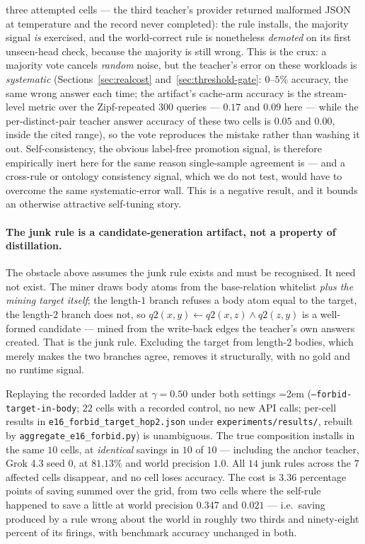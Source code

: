 \documentclass[11pt]{article}
\theoremstyle{plain}
\begin{document}
three attempted cells --- the third teacher's provider returned malformed JSON
at temperature and the record never completed): the
rule installs, the majority signal \emph{is} exercised, and the world-correct rule
is nonetheless \emph{demoted} on its first unseen-head check, because the majority
is still wrong. This is the crux: a majority vote cancels \emph{random} noise, but
the teacher's error on these workloads is \emph{systematic} (Sections~\ref{sec:realcost}
and~\ref{sec:threshold-gate}: $0$--$5\%$ accuracy, the same wrong answer each time;
the artifact's cache-arm accuracy is the stream-level metric over the
Zipf-repeated $300$ queries --- $0.17$ and $0.09$ here --- while the
per-distinct-pair teacher answer accuracy of these two cells is $0.05$ and
$0.00$, inside the cited range),
so the vote reproduces the mistake rather than washing it out. Self-consistency,
the obvious label-free promotion signal, is therefore empirically inert here for
the same reason single-sample agreement is --- and a cross-rule or ontology
consistency signal, which we do not test, would have to overcome the same
systematic-error wall. This is a negative result, and it bounds an otherwise
attractive self-tuning story.

\paragraph{The junk rule is a candidate-generation artifact, not a property of
distillation.} The obstacle above assumes the junk rule exists and must be
recognised. It need not exist. The miner draws body atoms from the base-relation
whitelist \emph{plus the mining target itself}; the length-$1$ branch refuses a
body atom equal to the target, the length-$2$ branch does not, so
$q2(x,y)\!\leftarrow\!q2(x,z)\wedge q2(z,y)$ is a well-formed candidate --- mined
from the write-back edges the teacher's own answers created. That is the junk
rule. Excluding the target from length-$2$ bodies, which merely makes the two
branches agree, removes it structurally, with no gold and no runtime signal.

Replaying the recorded ladder at $\gamma{=}0.50$ under both settings
{\emergencystretch=2em (\texttt{--forbid-target-in-body};
$22$ cells with a recorded control, no new API calls; per-cell results in
\texttt{e16\_forbid\_}\allowbreak\texttt{target\_hop2.json} under
\texttt{experiments/results/}, rebuilt by \texttt{aggregate\_e16\_forbid.py})} is unambiguous. The true
composition installs in the same $10$ cells, at
\emph{identical} savings in $10$ of $10$ --- including the anchor teacher, Grok
4.3 seed $0$, at $81.13\%$ and world precision $1.0$. All $14$ junk rules across
the $7$ affected cells disappear, and no cell loses accuracy. The cost is
$3.36$ percentage points of saving summed over the grid, from two cells where the
self-rule happened to save a little at world precision $0.347$ and $0.021$ --- i.e.\
saving produced by a rule wrong about the world in roughly two thirds and
ninety-eight percent of its firings, with benchmark accuracy unchanged in both.
\end{document}

